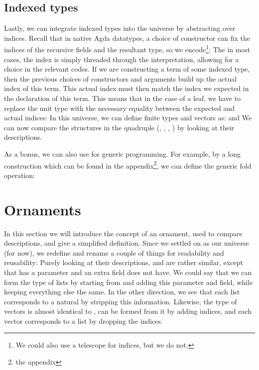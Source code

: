 \subsection{Indexed types}\label{ssec:background-ix}
Lastly, we can integrate indexed types into the universe by abstracting over indices. Recall that in native Agda datatypes, a choice of constructor can fix the indices of the recursive fields and the resultant type, so we encode\footnote{We could also use a telescope for indices, but we do not.}:
The in most cases, the index is simply threaded through the interpretation, allowing for a choice in the relevant codes. If we are constructing a term of some indexed type, then the previous choices of constructors and arguments build up the actual index of this term. This actual index must then match the index we expected in the declaration of this term. This means that in the case of a leaf, we have to replace the unit type with the necessary equality between the expected and actual indices:
In this universe, we can define finite types and vectors as:
and
We can now compare the structures in the quadruple (\bN{}, , , ) by looking at their descriptions.

As a bonus, we can also use  for generic programming. For example, by a long construction which can be found in the appendix\footnote{the appendix}, we can define the generic fold operation:

%

\section{Ornaments}\label{sec:background-ornaments}
In this section we will introduce the concept of an ornament, used to compare descriptions, and give a simplified definition. Since we settled on  as our universe (for now), we redefine and rename a couple of things for readability and reusability:
Purely looking at their descriptions, \bN{} and  are rather similar, except that  has a parameter and an extra field \bN{} does not have. We could say that we can form the type of lists by starting from \bN{} and adding this parameter and field, while keeping everything else the same. In the other direction, we see that each list corresponds to a natural by stripping this information. Likewise, the type of vectors is almost identical to , can be formed from it by adding indices, and each vector corresponds to a list by dropping the indices.

